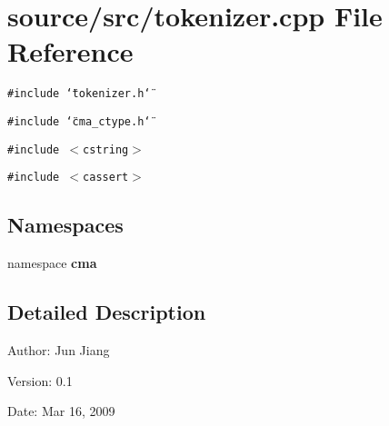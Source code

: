 \section{source/src/tokenizer.cpp File Reference}
\label{tokenizer_8cpp}
{\tt \#include \char`\"{}tokenizer.h\char`\"{}}\par
{\tt \#include \char`\"{}cma\_\-ctype.h\char`\"{}}\par
{\tt \#include $<$cstring$>$}\par
{\tt \#include $<$cassert$>$}\par
\subsection*{Namespaces}
\begin{CompactItemize}
\item 
namespace \textbf{cma}
\end{CompactItemize}


\subsection{Detailed Description}
\begin{Desc}
\item[Author:]Jun Jiang \end{Desc}
\begin{Desc}
\item[Version:]0.1 \end{Desc}
\begin{Desc}
\item[Date:]Mar 16, 2009 \end{Desc}
